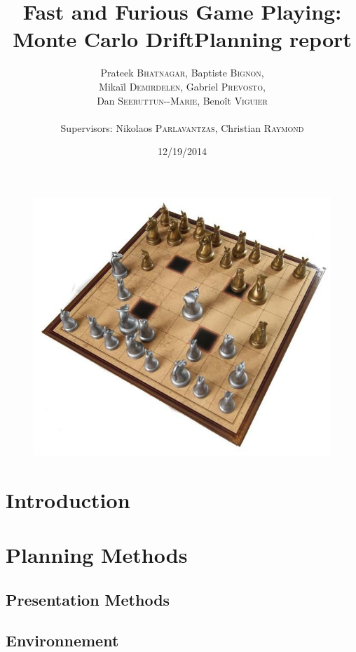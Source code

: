 \documentclass[12pt]{article}
\title{Fast and Furious Game Playing: Monte Carlo Drift\smallbreak Planning report} %
\author{Prateek \textsc{Bhatnagar}, Baptiste \textsc{Bignon}, \\
        Mikaïl \textsc{Demirdelen}, Gabriel \textsc{Prevosto}, \\
        Dan \textsc{Seeruttun-{}-Marie}, Benoît \textsc{Viguier} \\
        \\
        Supervisors: Nikolaos \textsc{Parlavantzas}, Christian \textsc{Raymond}}
\date{12/19/2014}
\begin{document}
\maketitle

\begin{figure}[!h] 
\centerline{\includegraphics[scale=0.50]{Pictures/arimaa}}
\end{figure}
\newpage

\tableofcontents
\newpage


\section{Introduction}						\label{sec:introduction} 		
\newpage

\section{Planning Methods} \label{sec:PlanningMethods}
	\subsection{Presentation Methods}		\label{sec:PresentationMethods}		%
	\subsection{Environnement}			\label{sec:environnement}	%
\newpage
\end{document}

